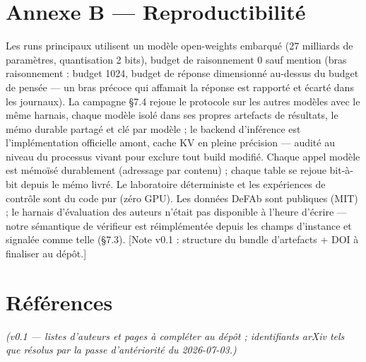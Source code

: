 \documentclass[11pt]{article}
\begin{document}
\section*{Annexe B — Reproductibilité}

Les runs principaux utilisent un modèle open-weights embarqué (27 milliards de paramètres, quantisation 2 bits), budget de raisonnement 0 sauf mention (bras raisonnement : budget 1024, budget de réponse dimensionné au-dessus du budget de pensée — un bras précoce qui affamait la réponse est rapporté et écarté dans les journaux). La campagne §7.4 rejoue le protocole sur les autres modèles avec le même harnais, chaque modèle isolé dans ses propres artefacts de résultats, le mémo durable partagé et clé par modèle ; le backend d'inférence est l'implémentation officielle amont, cache KV en pleine précision — audité au niveau du processus vivant pour exclure tout build modifié. Chaque appel modèle est mémoïsé durablement (adressage par contenu) ; chaque table se rejoue bit-à-bit depuis le mémo livré. Le laboratoire déterministe et les expériences de contrôle sont du code pur (zéro GPU). Les données DeFAb sont publiques (MIT) ; le harnais d'évaluation des auteurs n'était pas disponible à l'heure d'écrire — notre sémantique de vérifieur est réimplémentée depuis les champs d'instance et signalée comme telle (§7.3). [Note v0.1 : structure du bundle d'artefacts + DOI à finaliser au dépôt.]

\section*{Références}

\emph{(v0.1 — listes d'auteurs et pages à compléter au dépôt ; identifiants arXiv tels que résolus par la passe d'antériorité du 2026-07-03.)}
\end{document}
